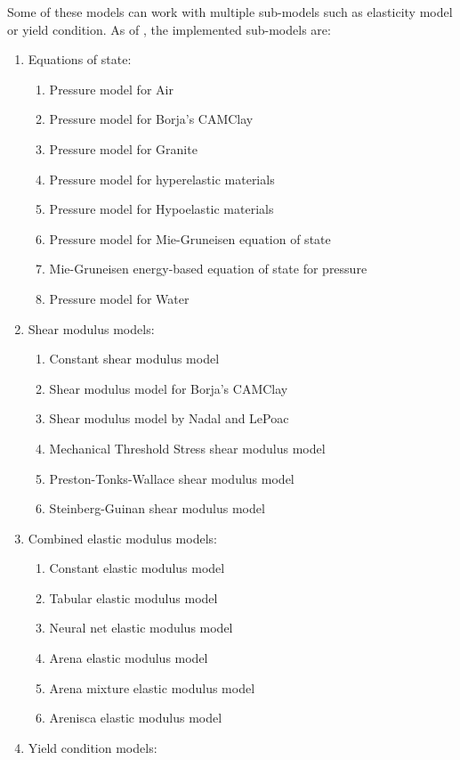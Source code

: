 Some of these models can work with multiple sub-models such as elasticity model
or yield condition.  As of \Vaango \version, the implemented sub-models are:
\begin{enumerate}
  \item Equations of state:
  \begin{enumerate}
    \item Pressure model for Air
    \item Pressure model for Borja's CAMClay
    \item Pressure model for Granite
    \item Pressure model for hyperelastic materials
    \item Pressure model for Hypoelastic materials
    \item Pressure model for Mie-Gruneisen equation of state
    \item Mie-Gruneisen energy-based equation of state for pressure
    \item Pressure model for Water
  \end{enumerate}
  \item Shear modulus models:
  \begin{enumerate}
    \item Constant shear modulus model
    \item Shear modulus model for Borja's CAMClay
    \item Shear modulus model by Nadal and LePoac
    \item Mechanical Threshold Stress shear modulus model
    \item Preston-Tonks-Wallace shear modulus model
    \item Steinberg-Guinan shear modulus model
  \end{enumerate}
  \item Combined elastic modulus models:
  \begin{enumerate}
    \item Constant elastic modulus model
    \item Tabular elastic modulus model
    \item Neural net elastic modulus model
    \item Arena elastic modulus model
    \item Arena mixture elastic modulus model
    \item Arenisca elastic modulus model
  \end{enumerate}
  \item Yield condition models:
  \begin{enumerate}

\end{enumerate}
\end{enumerate}
